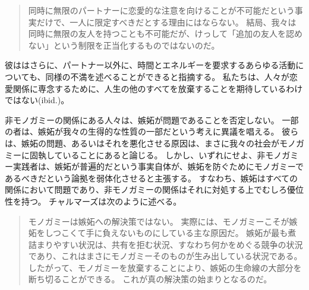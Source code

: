 \documentclass[paper=a4,book,openany]{jlreq}
\begin{document}
\begin{quote}
同時に無限のパートナーに恋愛的な注意を向けることが不可能だという事実だけで、一人に限定すべきだとする理由にはならない。
結局、我々は同時に無限の友人を持つことも不可能だが、けっして「追加の友人を認めない」という制限を正当化するものではないのだ。
\citep[p.232]{chalmers19:_is_monog_moral_permis}

\end{quote}

彼ははさらに、パートナー以外に、時間とエネルギーを要求するあらゆる活動についても、同様の不満を述べることができると指摘する。
私たちは、人々が恋愛関係に専念するために、人生の他のすべてを放棄することを期待しているわけではない(ibid.)。

非モノガミーの関係にある人々は、嫉妬が問題であることを否定しない。
一部の者は、嫉妬が我々の生得的な性質の一部だという考えに異議を唱える。
彼らは、嫉妬の問題、あるいはそれを悪化させる原因は、まさに我々の社会がモノガミーに固執していることにあると論じる。
しかし、いずれにせよ、非モノガミー実践者は、嫉妬が普遍的だという事実自体が、嫉妬を防ぐためにモノガミーであるべきだという論拠を弱体化させると主張する。
すなわち、嫉妬はすべての関係において問題であり、非モノガミーの関係はそれに対処する上でむしろ優位性を持つ。
チャルマーズは次のように述べる。

\begin{quote}
モノガミーは嫉妬への解決策ではない。
実際には、モノガミーこそが嫉妬をしつこくて手に負えないものにしている主な原因だ。
嫉妬が最も煮詰まりやすい状況は、共有を拒む状況、すなわち何かをめぐる競争の状況であり、これはまさにモノガミーそのものが生み出している状況である。
したがって、モノガミーを放棄することにより、嫉妬の生命線の大部分を断ち切ることができる。
これが真の解決策の始まりとなるのだ。
\citep[p.237]{chalmers19:_is_monog_moral_permis}
\end{quote}
\end{document}

